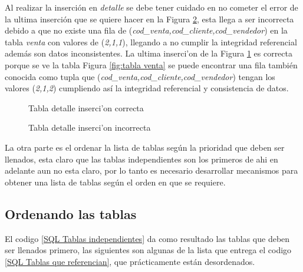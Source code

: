 Al realizar la inserci\'on en \textit{detalle} se debe tener cuidado en no cometer el error de la ultima inserci\'on que se quiere hacer en la Figura \ref{fig:InsercionIncorrecta}, esta llega a ser incorrecta debido a que no existe una fila de (\textit{cod\_venta,cod\_cliente,cod\_vendedor}) en la tabla \textit{venta} con valores de (\textit{2,1,1}), llegando a no cumplir la integridad referencial adem\'as son datos inconsistentes. La ultima inserci'on de la Figura \ref{fig:InsercionCorrecta} es correcta porque se ve la tabla Figura \ref{fig:tabla venta} se puede encontrar una fila tambi\'en conocida como tupla que (\textit{cod\_venta,cod\_cliente,cod\_vendedor}) tengan los valores (\textit{2,1,2}) cumpliendo as\'i la integridad referencial y consistencia de datos.

\begin{figure}[H]
\centering
{}
\caption{Tabla detalle inserci'on correcta} \label{fig:InsercionCorrecta}
\end{figure}

\begin{figure}[H]
\centering
{}
\caption{Tabla detalle inserci'on incorrecta} \label{fig:InsercionIncorrecta}
\end{figure}  
  
La otra parte es el ordenar la lista de tablas seg\'un la prioridad que deben ser llenados, esta claro que las tablas independientes son los primeros de ahi en adelante aun no esta claro, por lo tanto es necesario desarrollar mecanismos para obtener una lista de tablas seg\'un el orden en que se requiere.
\subsection{Ordenando las tablas}
El codigo \ref{SQL Tablas independientes} da  como resultado las tablas que deben ser llenados primero, las siguientes son algunas de la lista que entrega el codigo \ref{SQL Tablas que referencian}, que pr\'acticamente est\'an desordenados.

